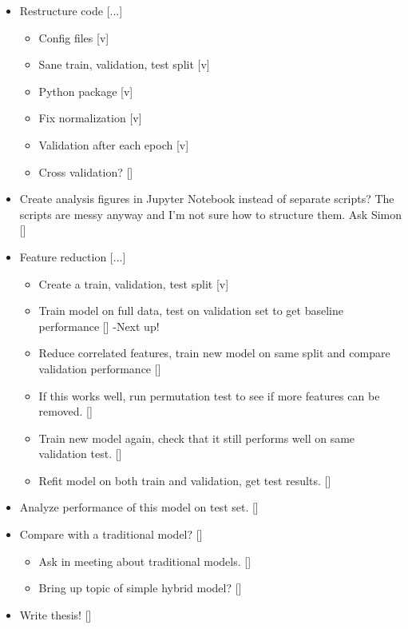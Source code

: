 \begin{itemize}
\item Restructure code [...] \begin{itemize}
\item Config files [v]
\item Sane train, validation, test split [v]
\item Python package [v]
\item Fix normalization [v]
\item Validation after each epoch [v]
\item Cross validation? []
\end{itemize}
\item Create analysis figures in Jupyter Notebook instead of separate scripts?
The scripts are messy anyway and I'm not sure how to structure them. Ask Simon []
\item Feature reduction [...]
\begin{itemize}
\item Create a train, validation, test split [v]
\item Train model on full data, test on validation set to get baseline performance [] -Next up!
\item Reduce correlated features, train new model on same split and compare validation performance []
\item If this works well, run permutation test to see if more features can be removed. []
\item Train new model again, check that it still performs well on same validation test. []
\item Refit model on both train and validation, get test results.  []
\end{itemize}
\item Analyze performance of this model on test set. []
\item Compare with a traditional model? []
    \begin{itemize}
        \item Ask in meeting about traditional models. []
        \item Bring up topic of simple hybrid model? []
    \end{itemize}
\item Write thesis! []
\end{itemize}
